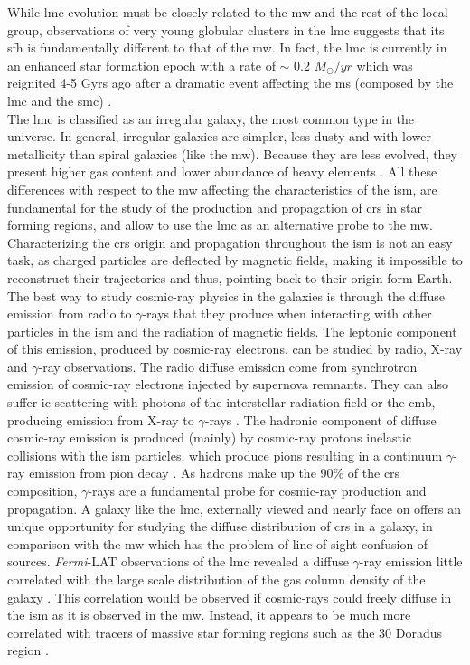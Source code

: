 \documentclass[main.tex]{subfiles}
\begin{document}
While \gls{lmc} evolution must  be closely related to the \gls{mw} and the rest of the local group, observations of very young globular clusters in the \gls{lmc} suggests that its \gls{sfh} is fundamentally different to that of the \gls{mw}. In fact, the \gls{lmc} is currently in an enhanced star formation epoch with a rate of $\sim$ 0.2 $M_{\odot}/yr$ which was reignited 4-5 Gyrs ago after a dramatic event affecting the \gls{ms} (composed by the \gls{lmc} and the \gls{smc}) \cite{2009SFHofLMC}.\\
The \gls{lmc} is classified as an irregular galaxy, the most common type in the universe. In general, irregular galaxies are simpler, less dusty and with lower metallicity than spiral galaxies (like the \gls{mw}). Because they are less evolved, they present higher gas content and lower abundance of heavy elements \cite{2013InfrarredLMC}. All these differences with respect to the \gls{mw} affecting the characteristics of the \gls{ism}, are fundamental for the study of the production and propagation of \glspl{cr} in star forming regions, and allow to use the \gls{lmc} as an alternative probe to the \gls{mw}.
Characterizing the \glspl{cr} origin and propagation throughout the \gls{ism} is not an easy task, as charged particles are deflected by magnetic fields, making it impossible to reconstruct their trajectories and thus, pointing back to their origin form Earth. The best way to study cosmic-ray physics in the galaxies is through the diffuse emission from radio to $\gamma$-rays that they produce when interacting with other particles in the \gls{ism} and the radiation of magnetic fields. The leptonic component of this emission, produced by cosmic-ray electrons, can be studied by radio, X-ray and $\gamma$-ray observations. The radio diffuse emission come from synchrotron emission of cosmic-ray electrons injected by supernova remnants. They can also suffer \gls{ic} scattering with photons of the interstellar radiation field or the \gls{cmb}, producing emission from X-ray to $\gamma$-rays \cite{2008ICgammaray}. The hadronic component of diffuse cosmic-ray emission is produced (mainly) by cosmic-ray protons inelastic collisions with the \gls{ism} particles, which produce pions resulting in a continuum $\gamma$-ray emission from pion decay \cite{1963Pimesonsproducegammarays}. As hadrons make up the 90\% of the \glspl{cr} composition, $\gamma$-rays are a fundamental probe for cosmic-ray production and propagation. 
A galaxy like the \gls{lmc}, externally viewed and nearly face on offers an unique opportunity for studying the diffuse distribution of \glspl{cr} in a galaxy, in comparison with the \gls{mw} which has the problem of line-of-sight confusion of sources. \textit{Fermi}-LAT observations of the \gls{lmc} revealed a diffuse $\gamma$-ray emission little correlated with the large scale distribution of the gas column density of the galaxy \cite{2010FermiLATLMC11months}. This correlation would be observed if cosmic-rays could freely diffuse in the \gls{ism} as it is observed in the \gls{mw}. Instead, it appears to be much more correlated with tracers of massive star forming regions such as the 30 Doradus region \cite{2012CRinLMC30Doradus}.\\
\end{document}
